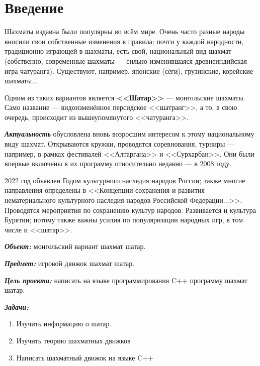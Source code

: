 {
	\chapter*{Введение}
	Шахматы издавна были популярны во всём мире. Очень часто разные народы вносили свои собственные изменения в правила; почти у каждой народности, традиционно играющей в шахматы, есть свой, национальный вид шахмат (собственно, современные шахматы --- сильно изменившаяся древнеиндийская игра чатуранга). Существуют, например, японские (сёги), грузинские, корейские шахматы...
	
	Одним из таких вариантов является \textbf{<<Шатар>>} --- монгольские шахматы. Само название --- видоизменённое персидское <<шатранг>>, а то, в свою очередь, происходит из вышеупомянутого <<чатуранга>>.
	
	\textbf{\textit{Актуальность}} обусловлена вновь возросшим интересом к этому национальному виду шахмат. Открываются кружки, проводятся соревнования, турниры --- например, в рамках фестивалей <<Алтаргана>> и <<Сурхарбан>>. Они были впервые включены в их программу относительно недавно --- в 2008 году.	
	
	2022 год  объявлен Годом культурного наследия народов России; также многие направления определены в <<Концепции сохранения и развития нематериального культурного наследия народов Российской Федерации...>>. Проводятся мероприятия по сохранению культур народов. Развивается и культура Бурятии; потому  также важны  усилия по популяризации народных игр, в том числе и <<шатар>>.
	
	\textbf{\textit{Объект:}} монгольский вариант шахмат шатар.
	
	\textbf{\textit{Предмет:}} игровой движок шахмат шатар.
	
	\textbf{\textit{Цель проекта:}} написать на языке программирования C++ программу шахмат шатар.
	
	\textbf{\textit{Задачи:}}
	
	\begin{enumerate}
		\item Изучить информацию о шатар.
		\item Изучить теорию шахматных движков
		\item Написать шахматный движок на языке C++
	\end{enumerate}
	\clearpage
}